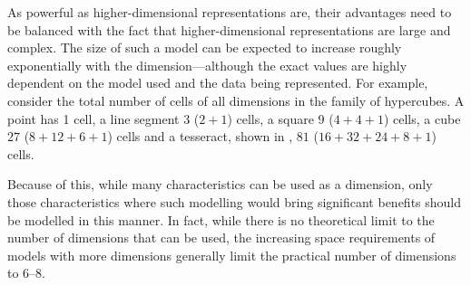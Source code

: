 As powerful as higher-dimensional representations are, their advantages need to be balanced with the fact that higher-dimensional representations are large and complex.
The size of such a model can be expected to increase roughly exponentially with the dimension---although the exact values are highly dependent on the model used and the data being represented.
For example, consider the total number of cells of all dimensions in the family of hypercubes.
A point has 1 cell, a line segment $3$ ($2+1$) cells, a square $9$ ($4+4+1$) cells, a cube $27$ ($8+12+6+1$) cells and a tesseract, shown in , $81$ ($16+32+24+8+1$) cells.

Because of this, while many characteristics can be used as a dimension, only those characteristics where such modelling would bring significant benefits should be modelled in this manner.
In fact, while there is no theoretical limit to the number of dimensions that can be used, the increasing space requirements of models with more dimensions generally limit the practical number of dimensions to 6--8.

